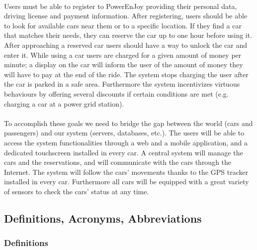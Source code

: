 \documentclass[english]{article}
\begin{document}
\paragraph{}
Users must be able to register to PowerEnJoy providing their personal data, driving license and payment information.
After registering, users should be able to look for available cars near them or to a specific location. If they find a car that matches their needs, they can reserve the car up to one hour before using it. After approaching a reserved car users should have a way to unlock the car and enter it.
While using a car users are charged for a given amount of money per minute; a display on the car will inform the user of the amount of money they will have to pay at the end of the ride.
The system stops charging the user after the car is parked in a safe area.
Furthermore the system incentivizes virtuous behaviours by offering several discounts if certain conditions are met (e.g. charging a car at a power grid station).

\paragraph{}
To accomplish these goals we need to bridge the gap between the world (cars and passengers) and our system (servers, databases, etc.).
The users will be able to access the system functionalities through a web and a mobile application, and a dedicated touchscreen installed in every car.
A central system will manage the cars and the reservations, and will communicate with the cars through the Internet. The system will follow the cars’ movements thanks to the GPS tracker installed in every car. Furthermore all cars will be equipped with a great variety of sensors to check the cars’ status at any time.


\subsection{Definitions, Acronyms, Abbreviations}

\subsubsection{Definitions}
\end{document}

